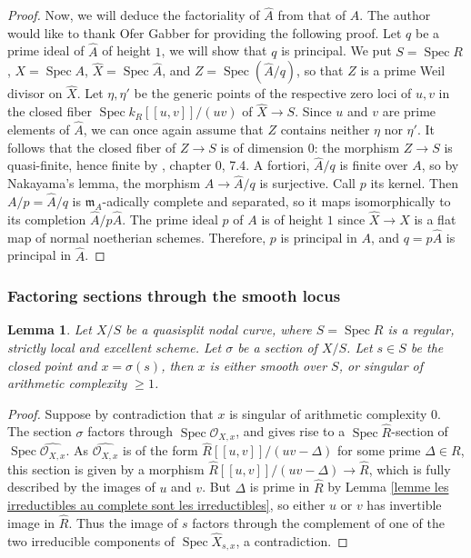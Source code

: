\documentclass[a4paper,10pt,twoside]{article}
\newcommand{\ra}{\rightarrow}
\renewcommand{\O}{\mathcal{O}}
\DeclareMathOperator{\spec}{Spec}
\newtheorem{lem}[thm]{Lemma}
\theoremstyle{definition}
\theoremstyle{remark}
\begin{document}
\begin{proof}
	Now, we will deduce the factoriality of $\widehat{A}$ from that of $A$. The author would like to thank Ofer Gabber for providing the following proof. Let $q$ be a prime ideal of $\widehat{A}$ of height $1$, we will show that $q$ is principal. We put $S=\spec R$, $X=\spec A$, $\widehat{X}=\spec \widehat{A}$, and $Z=\spec (\widehat{A}/q)$, so that $Z$ is a prime Weil divisor on $\widehat{X}$. Let $\eta,\eta'$ be the generic points of the respective zero loci of $u,v$ in the closed fiber $\spec k_R[[u,v]]/(uv)$ of $\widehat{X}\to S$. Since $u$ and $v$ are prime elements of $\widehat{A}$, we can once again assume that $Z$ contains neither $\eta$ nor $\eta'$. It follows that the closed fiber of $Z \to S$ is of dimension $0$: the morphism $Z\to S$ is quasi-finite, hence finite by \cite{EGA1}, chapter 0, 7.4. A fortiori, $\widehat{A}/q$ is finite over $A$, so by Nakayama's lemma, the morphism $A \to \widehat{A}/q$ is surjective. Call $p$ its kernel. Then $A/p=\widehat{A}/q$ is $\mathfrak{m}_A$-adically complete and separated, so it maps isomorphically to its completion $\widehat{A}/p\widehat{A}$. The prime ideal $p$ of $A$ is of height $1$ since $\widehat{X}\to X$ is a flat map of normal noetherian schemes. Therefore, $p$ is principal in $A$, and $q=p\widehat{A}$ is principal in $\widehat{A}$.
\end{proof}

\subsubsection{Factoring sections through the smooth locus}


\begin{lem}\label{lemme pas de sections a travers les points de complexite 0}
	Let $X/S$ be a quasisplit nodal curve, where $S=\spec R$ is a regular, strictly local and excellent scheme. Let $\sigma$ be a section of $X/S$. Let $s\in S$ be the closed point and $x=\sigma(s)$, then $x$ is either smooth over $S$, or singular of arithmetic complexity $\geq 1$.
\end{lem}

\begin{proof}
	Suppose by contradiction that $x$ is singular of arithmetic complexity $0$. The section $\sigma$ factors through $\spec \O_{X,x}$, and gives rise to a $\spec \widehat{R}$-section of $\spec\widehat{\O_{X,x}}$. As $\widehat{\O_{X,x}}$ is of the form $\widehat{R}[[u,v]]/(uv-\Delta)$ for some prime $\Delta\in R$, this section is given by a morphism $\widehat{R}[[u,v]]/(uv-\Delta)\ra\widehat{R}$, which is fully described by the images of $u$ and $v$. But $\Delta$ is prime in $\widehat{R}$ by Lemma \ref{lemme les irreductibles au complete sont les irreductibles}, so either $u$ or $v$ has invertible image in $\widehat{R}$. Thus the image of $s$ factors through the complement of one of the two irreducible components of $\spec\widehat X_{s,x}$, a contradiction.
\end{proof}
\end{document}
